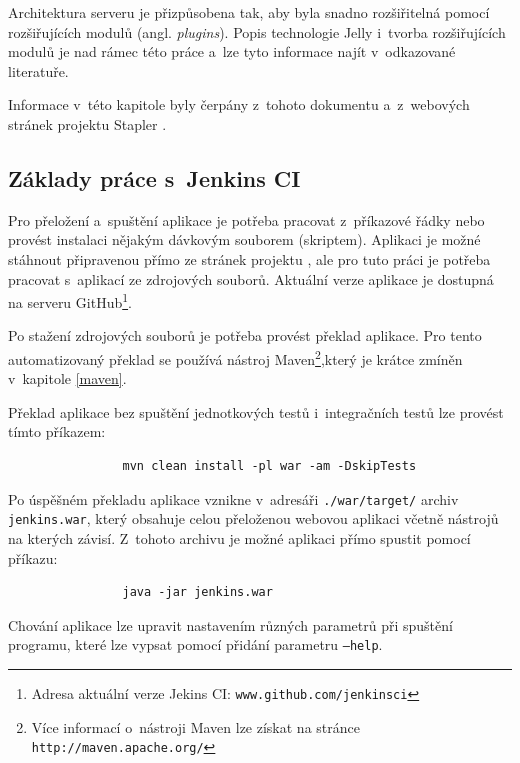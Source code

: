             Architektura serveru je přizpůsobena tak, aby byla snadno rozšiřitelná
            pomocí rozšiřujících modulů (angl. \emph{plugins}). Popis technologie Jelly
            i~tvorba rozšiřujících modulů je nad rámec této práce a~lze tyto informace
            najít v~odkazované literatuře.
        
            Informace v~této kapitole byly čerpány z~tohoto dokumentu \cite{architectureOverview}
            a~z~webových stránek projektu Stapler \cite{staplerWeb}.

        \subsection{Základy práce s~Jenkins CI} \label{jenkinsUsage}
            Pro přeložení a~spuštění aplikace je potřeba pracovat z~příkazové řádky nebo provést instalaci nějakým dávkovým souborem (skriptem).
            Aplikaci je možné stáhnout připravenou přímo ze stránek projektu \cite{jenkinsWeb}, ale pro tuto práci je potřeba 
            pracovat s~aplikací ze zdrojových souborů. Aktuální verze aplikace je dostupná na serveru 
            GitHub\footnote{Adresa aktuální verze Jekins CI: \texttt{www.github.com/jenkinsci}}.

            Po stažení zdrojových souborů je potřeba provést překlad aplikace. Pro tento automatizovaný 
            překlad se používá nástroj Maven\footnote{Více informací o~nástroji Maven lze získat na stránce 
            \texttt{http://maven.apache.org/}},který je krátce zmíněn v~kapitole \ref{maven}. 
            
            Překlad aplikace bez spuštění jednotkových testů i~integračních testů lze provést tímto příkazem:
            \begin{verbatim}
                mvn clean install -pl war -am -DskipTests
            \end{verbatim}
            
            \medskip
            Po úspěšném překladu aplikace vznikne v~adresáři \texttt{./war/target/} archiv \texttt{jenkins.war}, 
            který obsahuje celou přeloženou webovou aplikaci včetně nástrojů na 
            kterých závisí. Z~tohoto archivu je možné aplikaci přímo spustit pomocí příkazu:

            \begin{verbatim}
                java -jar jenkins.war
            \end{verbatim}
            Chování aplikace lze upravit nastavením různých parametrů při spuštění programu, 
            které lze vypsat pomocí přidání parametru \texttt{--help}.

